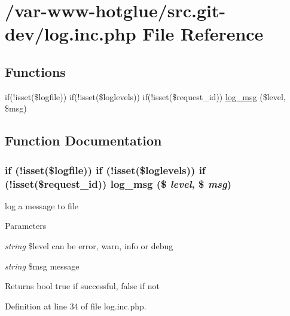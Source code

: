 \hypertarget{log_8inc_8php}{
\section{/var-\/www-\/hotglue/src.git-\/dev/log.inc.php File Reference}
\label{log_8inc_8php}
}
\subsection*{Functions}
\begin{DoxyCompactItemize}
\item 
if(!isset(\$logfile)) if(!isset(\$loglevels)) if(!isset(\$request\_\-id)) \hyperlink{log_8inc_8php_a0d59d693ca96c65b67de4b197954ce60}{log\_\-msg} (\$level, \$msg)
\end{DoxyCompactItemize}


\subsection{Function Documentation}
\hypertarget{log_8inc_8php_a0d59d693ca96c65b67de4b197954ce60}{
\subsubsection[{log\_\-msg}]{\setlength{\rightskip}{0pt plus 5cm}if (!isset(\$logfile)) if (!isset(\$loglevels)) if (!isset(\$request\_\-id)) log\_\-msg (\$ {\em level}, \/  \$ {\em msg})}}
\label{log_8inc_8php_a0d59d693ca96c65b67de4b197954ce60}
log a message to file


\begin{DoxyParams}{Parameters}
\item[{\em string}]\$level can be error, warn, info or debug \item[{\em string}]\$msg message \end{DoxyParams}
\begin{DoxyReturn}{Returns}
bool true if successful, false if not 
\end{DoxyReturn}


Definition at line 34 of file log.inc.php.

